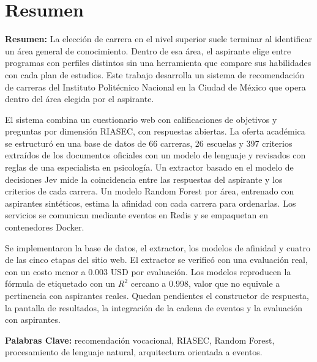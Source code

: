 \chapter{Resumen}

\textbf{Resumen:} La elección de carrera en el nivel superior suele terminar al identificar un área general de conocimiento. Dentro de esa área, el aspirante elige entre programas con perfiles distintos sin una herramienta que compare sus habilidades con cada plan de estudios. Este trabajo desarrolla un sistema de recomendación de carreras del Instituto Politécnico Nacional en la Ciudad de México que opera dentro del área elegida por el aspirante.

El sistema combina un cuestionario web con calificaciones de objetivos y preguntas por dimensión RIASEC, con respuestas abiertas. La oferta académica se estructuró en una base de datos de 66 carreras, 26 escuelas y 397 criterios extraídos de los documentos oficiales con un modelo de lenguaje y revisados con reglas de una especialista en psicología. Un extractor basado en el modelo de decisiones Jev mide la coincidencia entre las respuestas del aspirante y los criterios de cada carrera. Un modelo Random Forest por área, entrenado con aspirantes sintéticos, estima la afinidad con cada carrera para ordenarlas. Los servicios se comunican mediante eventos en Redis y se empaquetan en contenedores Docker.

Se implementaron la base de datos, el extractor, los modelos de afinidad y cuatro de las cinco etapas del sitio web. El extractor se verificó con una evaluación real, con un costo menor a 0.003 USD por evaluación. Los modelos reproducen la fórmula de etiquetado con un $R^2$ cercano a 0.998, valor que no equivale a pertinencia con aspirantes reales. Quedan pendientes el constructor de respuesta, la pantalla de resultados, la integración de la cadena de eventos y la evaluación con aspirantes.

\textbf{Palabras Clave:} recomendación vocacional, RIASEC, Random Forest, procesamiento de lenguaje natural, arquitectura orientada a eventos.




\endinput 
